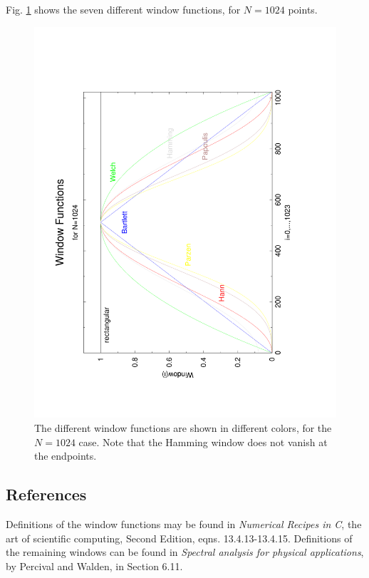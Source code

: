 \documentclass{article}
\begin{document}
Fig. \ref{f:window} shows the seven different window functions, for
$N=1024$ points.
\begin{figure}
\hskip -0.5in
\noindent\includegraphics[width=0.9\linewidth,angle=-90]{WindowFig}
\caption{\label{f:window}
The different window functions are shown in different colors, for the
$N=1024$ case. Note that the Hamming window does not vanish at the endpoints.}
\end{figure}

\subsection{References}

Definitions of the window functions may be found in {\it Numerical Recipes in C},
the art of scientific computing, Second Edition, eqns. 13.4.13-13.4.15.  Definitions
of the remaining windows can be found in {\it Spectral analysis for physical applications},
by Percival and Walden, in Section 6.11.
\end{document}
